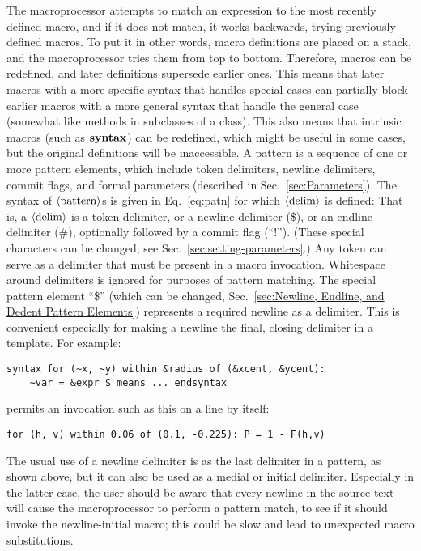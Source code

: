\documentclass[12pt]{article}
\begin{document}
The macroprocessor attempts to match an expression to the most recently defined macro, and if it does not match, it works backwards, trying previously defined macros.
To put it in other words, macro definitions are placed on a stack, and the macroprocessor tries them from top to bottom.
Therefore, macros can be redefined, and later definitions supersede earlier ones.
This means that later macros with a more specific syntax that handles special cases can partially block earlier macros with a more general syntax that handle the general case (somewhat like methods in subclasses of a class).
This also means that intrinsic macros (such as ${\bf syntax}$) can be redefined, which might be useful in some cases, but the original definitions will be inaccessible.
A pattern is a sequence of one or more pattern elements, which include token delimiters, newline delimiters, commit flags, and formal parameters (described in Sec.\ \ref{sec:Parameters}).
The syntax of $\langle\mbox{pattern}\rangle$s is given in Eq.\ \ref{eq:patn} for which $\langle\mbox{delim}\rangle$ is defined:
That is, a $ \langle\mbox{delim}\rangle$ is a token delimiter, or a newline delimiter (\$), or an endline delimiter (\#), optionally followed by a commit flag (``!'').
(These special characters can be changed; see Sec.\ \ref{sec:setting-parameters}.)
Any token can serve as a delimiter that must be present in a macro invocation.
Whitespace around delimiters is ignored for purposes of pattern matching.
\label{sec:newline-delimiters}
The special pattern element ``\$''  (which can be changed, 
Sec.\ \ref{sec:Newline, Endline, and Dedent Pattern Elements}) 
represents a required newline as a delimiter.
This is convenient especially for making a newline the final, closing delimiter in a template.
For example:
\begin{lstlisting}[frame=single]
syntax for (~x, ~y) within &radius of (&xcent, &ycent):
    ~var = &expr $ means ... endsyntax
\end{lstlisting}
permits an invocation such as this on a line by itself:
\begin{lstlisting}[frame=single]
for (h, v) within 0.06 of (0.1, -0.225): P = 1 - F(h,v)
\end{lstlisting}
The usual use of a newline delimiter is as the last delimiter in a pattern, as shown above, but it can also be used as a medial or initial delimiter.
Especially in the latter case, the user should be aware that every newline in the source text will cause the macroprocessor to perform a pattern match, to see if it should invoke the newline-initial macro;
this could be slow and lead to unexpected macro substitutions.
\end{document}
